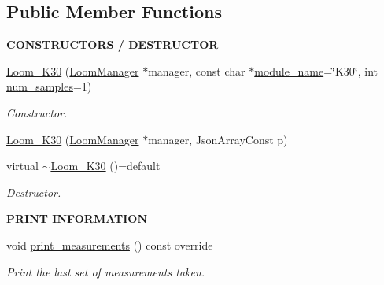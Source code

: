 \subsection*{Public Member Functions}
\begin{Indent}{\bf C\+O\+N\+S\+T\+R\+U\+C\+T\+O\+RS / D\+E\+S\+T\+R\+U\+C\+T\+OR}\par
\begin{DoxyCompactItemize}
\item 
\hyperlink{class_loom___k30_adcbe5982ebd5edc1cacb06eca55e4f7b}{Loom\+\_\+\+K30} (\hyperlink{class_loom_manager}{Loom\+Manager} $\ast$manager, const char $\ast$\hyperlink{class_loom_module_adf6e68ad7e9fa2acfca7a8a280680764}{module\+\_\+name}=\char`\"{}K30\char`\"{}, int \hyperlink{class_loom_sensor_a0e74ebbaecde15ed1c71e1bb6bc6aebe}{num\+\_\+samples}=1)
\begin{DoxyCompactList}\small\item\em Constructor. \end{DoxyCompactList}\item 
\hyperlink{class_loom___k30_a5177bbcfd75e763efd286d0bbb799475}{Loom\+\_\+\+K30} (\hyperlink{class_loom_manager}{Loom\+Manager} $\ast$manager, Json\+Array\+Const p)
\item 
virtual \hyperlink{class_loom___k30_a0863089be8f2e4a378e85406838c0b50}{$\sim$\+Loom\+\_\+\+K30} ()=default
\begin{DoxyCompactList}\small\item\em Destructor. \end{DoxyCompactList}\end{DoxyCompactItemize}
\end{Indent}
\begin{Indent}{\bf P\+R\+I\+NT I\+N\+F\+O\+R\+M\+A\+T\+I\+ON}\par
\begin{DoxyCompactItemize}
\item 
void \hyperlink{class_loom___k30_a341fce3e5008b4a7b5bbb0c6d5a5cb71}{print\+\_\+measurements} () const override
\begin{DoxyCompactList}\small\item\em Print the last set of measurements taken. \end{DoxyCompactList}\end{DoxyCompactItemize}
\end{Indent}
